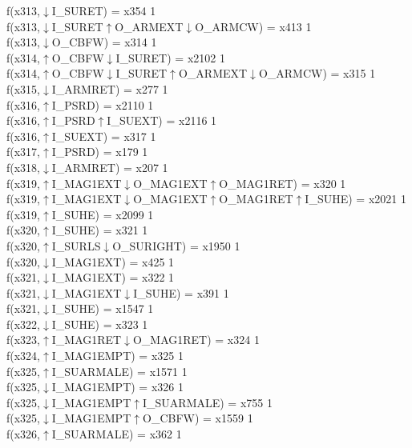 f(x313,$\downarrow$I\_SURET) = x354 {1} \\
f(x313,$\downarrow$I\_SURET$\uparrow$O\_ARMEXT$\downarrow$O\_ARMCW) = x413 {1} \\
f(x313,$\downarrow$O\_CBFW) = x314 {1} \\
f(x314,$\uparrow$O\_CBFW$\downarrow$I\_SURET) = x2102 {1} \\
f(x314,$\uparrow$O\_CBFW$\downarrow$I\_SURET$\uparrow$O\_ARMEXT$\downarrow$O\_ARMCW) = x315 {1} \\
f(x315,$\downarrow$I\_ARMRET) = x277 {1} \\
f(x316,$\uparrow$I\_PSRD) = x2110 {1} \\
f(x316,$\uparrow$I\_PSRD$\uparrow$I\_SUEXT) = x2116 {1} \\
f(x316,$\uparrow$I\_SUEXT) = x317 {1} \\
f(x317,$\uparrow$I\_PSRD) = x179 {1} \\
f(x318,$\downarrow$I\_ARMRET) = x207 {1} \\
f(x319,$\uparrow$I\_MAG1EXT$\downarrow$O\_MAG1EXT$\uparrow$O\_MAG1RET) = x320 {1} \\
f(x319,$\uparrow$I\_MAG1EXT$\downarrow$O\_MAG1EXT$\uparrow$O\_MAG1RET$\uparrow$I\_SUHE) = x2021 {1} \\
f(x319,$\uparrow$I\_SUHE) = x2099 {1} \\
f(x320,$\uparrow$I\_SUHE) = x321 {1} \\
f(x320,$\uparrow$I\_SURLS$\downarrow$O\_SURIGHT) = x1950 {1} \\
f(x320,$\downarrow$I\_MAG1EXT) = x425 {1} \\
f(x321,$\downarrow$I\_MAG1EXT) = x322 {1} \\
f(x321,$\downarrow$I\_MAG1EXT$\downarrow$I\_SUHE) = x391 {1} \\
f(x321,$\downarrow$I\_SUHE) = x1547 {1} \\
f(x322,$\downarrow$I\_SUHE) = x323 {1} \\
f(x323,$\uparrow$I\_MAG1RET$\downarrow$O\_MAG1RET) = x324 {1} \\
f(x324,$\uparrow$I\_MAG1EMPT) = x325 {1} \\
f(x325,$\uparrow$I\_SUARMALE) = x1571 {1} \\
f(x325,$\downarrow$I\_MAG1EMPT) = x326 {1} \\
f(x325,$\downarrow$I\_MAG1EMPT$\uparrow$I\_SUARMALE) = x755 {1} \\
f(x325,$\downarrow$I\_MAG1EMPT$\uparrow$O\_CBFW) = x1559 {1} \\
f(x326,$\uparrow$I\_SUARMALE) = x362 {1} \\

